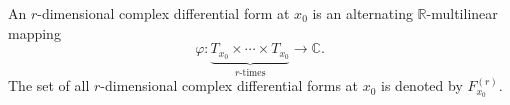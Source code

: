 An $r$-dimensional complex differential form at $x_0$ is an alternating $\mathbb{R}$-multilinear mapping
$$\varphi: \underbrace{T_{x_0} \times \cdots \times T_{x_0}}_{r\text{-times}} \to \mathbb{C}.$$
The set of all $r$-dimensional complex differential forms at $x_0$ is denoted by $F_{x_0}^{(r)}$.
